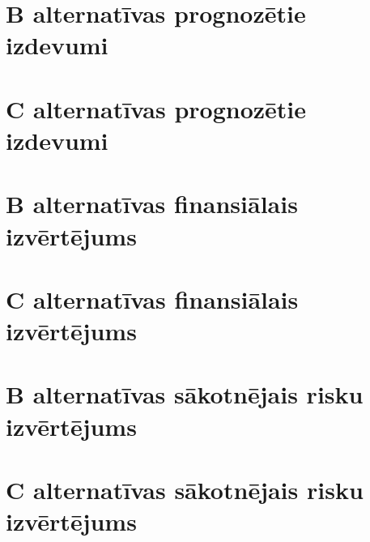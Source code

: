 \section{B alternatīvas prognozētie izdevumi}
	\label{app:B_izdevumi}
    \begin{figure}
        \centering 
        
    \end{figure}
    \clearpage
\section{C alternatīvas prognozētie izdevumi}
	\label{app:C_izdevumi}
    \begin{figure}
        \centering 
        
    \end{figure}
    \clearpage
\section{B alternatīvas finansiālais izvērtējums}
	\label{app:B_finansialais_vertejums}
    \begin{figure}
        \centering 
        
    \end{figure}
    \clearpage
\section{C alternatīvas finansiālais izvērtējums}
	\label{app:C_finansialais_vertejums}
    \begin{figure}
        \centering 
        
    \end{figure}
    \clearpage
\section{B alternatīvas sākotnējais risku izvērtējums}
    \label{app:B_sakotnejie_riski}
    \begin{figure}
        \centering 
        
    \end{figure}
    \clearpage
\section{C alternatīvas sākotnējais risku izvērtējums}
	\label{app:C_sakotnejie_riski}
    \begin{figure}
        \centering 
        
    \end{figure}
    \clearpage

